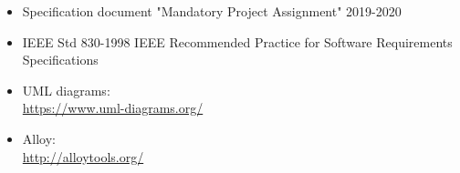 \documentclass[./main.tex]{subfiles}
\begin{document}
\begin{itemize}
\item
  Specification document "Mandatory Project Assignment" 2019-2020
\item
  IEEE Std 830-­1998 IEEE Recommended Practice for Software Requirements
  Specifications
\item
  UML diagrams:\\
  \url{https://www.uml-diagrams.org/}
\item
  Alloy:\\
  \url{http://alloytools.org/}
\end{itemize}
\end{document}
